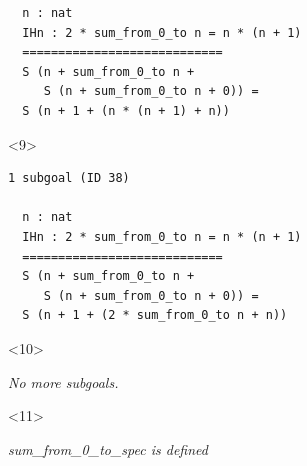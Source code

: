 \documentclass{beamer}
\begin{document}
\begin{frame}[fragile]
\begin{columns}
\begin{column}{0.7\textwidth}
\begin{onlyenv}
\begin{verbatim}
  n : nat
  IHn : 2 * sum_from_0_to n = n * (n + 1)
  ============================
  S (n + sum_from_0_to n +
     S (n + sum_from_0_to n + 0)) =
  S (n + 1 + (n * (n + 1) + n))
    \end{verbatim}
    \endminipage
    \end{onlyenv}

    \begin{onlyenv}<9>
    \minipage[c][0.65\textheight][s]{\columnwidth}
    \begin{verbatim}
1 subgoal (ID 38)
  
  n : nat
  IHn : 2 * sum_from_0_to n = n * (n + 1)
  ============================
  S (n + sum_from_0_to n +
     S (n + sum_from_0_to n + 0)) =
  S (n + 1 + (2 * sum_from_0_to n + n))
    \end{verbatim}
    \endminipage
    \end{onlyenv}

    \begin{onlyenv}<10>
    \minipage[c][0.65\textheight][s]{\columnwidth}
    \vspace{40ex}

    \textit{No more subgoals.}
    \endminipage
    \end{onlyenv}

    \begin{onlyenv}<11>
    \minipage[c][0.65\textheight][s]{\columnwidth}
    \vspace{40ex}

    \textit{sum\_from\_0\_to\_spec is defined}
    \endminipage
    \end{onlyenv}

    \end{column}
  \end{columns}
\end{frame}
\end{document}
